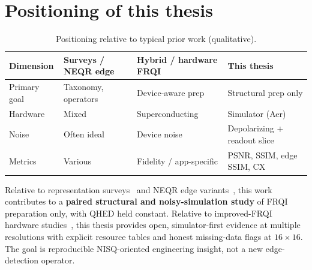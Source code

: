 \section{Positioning of this thesis}
\begin{table}[htbp]
\centering
\caption{Positioning relative to typical prior work (qualitative).}
\label{tab:positioning}
\small
\begin{tabular}{p{2.8cm}p{3.5cm}p{3.5cm}p{3.5cm}}
\toprule
Dimension & Surveys / NEQR edge & Hybrid / hardware FRQI & This thesis \\
\midrule
Primary goal & Taxonomy, operators & Device-aware prep & Structural prep only \\
Hardware & Mixed & Superconducting & Simulator (Aer) \\
Noise & Often ideal & Device noise & Depolarizing + readout slice \\
Metrics & Various & Fidelity / app-specific & PSNR, SSIM, edge SSIM, CX \\
\bottomrule
\end{tabular}
\end{table}

Relative to representation surveys~\cite{Ruan2021OpportunitiesChallenges,Farooq2025SystematicReview} and NEQR edge variants~\cite{Fan2019SobelNEQR,Liu2022EightDirectionSobelNEQR}, this work contributes to a \textbf{paired structural and noisy-simulation study} of FRQI preparation only, with QHED held constant. Relative to improved-FRQI hardware studies~\cite{Geng2023ImprovedFRQI}, this thesis provides open, simulator-first evidence at multiple resolutions with explicit resource tables and honest missing-data flags at $16\times 16$. The goal is reproducible NISQ-oriented engineering insight, not a new edge-detection operator.
